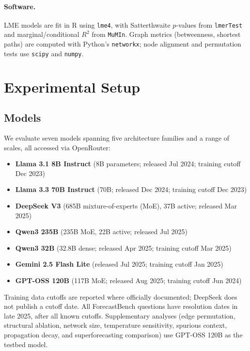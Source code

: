 \documentclass[11pt]{article}
\begin{document}
\paragraph{Software.} LME models are fit in R using \texttt{lme4}, with Satterthwaite $p$-values from \texttt{lmerTest} and marginal/conditional $R^2$ from \texttt{MuMIn}. Graph metrics (betweenness, shortest paths) are computed with Python's \texttt{networkx}; node alignment and permutation tests use \texttt{scipy} and \texttt{numpy}.

\section{Experimental Setup}
\label{sec:setup}

\subsection{Models}

We evaluate seven models spanning five architecture families and a range of scales, all accessed via OpenRouter:
\begin{itemize}
    \item \textbf{Llama 3.1 8B Instruct} (8B parameters; released Jul 2024; training cutoff Dec 2023)
    \item \textbf{Llama 3.3 70B Instruct} (70B; released Dec 2024; training cutoff Dec 2023)
    \item \textbf{DeepSeek V3} (685B mixture-of-experts (MoE), 37B active; released Mar 2025)
    \item \textbf{Qwen3 235B} (235B MoE, 22B active; released Jul 2025)
    \item \textbf{Qwen3 32B} (32.8B dense; released Apr 2025; training cutoff Mar 2025)
    \item \textbf{Gemini 2.5 Flash Lite} (released Jul 2025; training cutoff Jan 2025)
    \item \textbf{GPT-OSS 120B} (117B MoE; released Aug 2025; training cutoff Jun 2024)
\end{itemize}
Training data cutoffs are reported where officially documented; DeepSeek does not publish a cutoff date. All ForecastBench questions have resolution dates in late 2025, after all known cutoffs. Supplementary analyses (edge permutation, structural ablation, network size, temperature sensitivity, spurious context, propagation decay, and superforecasting comparison) use GPT-OSS 120B as the testbed model.
\end{document}
